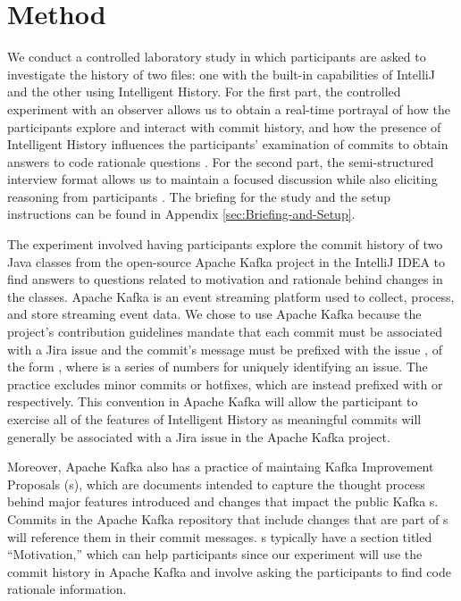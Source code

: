 \section{Method}
\label{sec:Method}

We conduct a controlled laboratory study in which participants are
asked to investigate the history of two files: one with the built-in
capabilities of IntelliJ and the other using Intelligent History.
For the first part, the controlled experiment with an observer allows us to obtain a real-time 
portrayal of how the participants explore and interact with commit history,
and how the presence of Intelligent History influences the participants'
examination of commits to obtain answers to code rationale questions \cite{shull_guide_2007}.
For the second part, the semi-structured interview format allows us to maintain a focused discussion 
while also eliciting reasoning from participants \cite{shull_guide_2007}.
The briefing for the study and the setup instructions can be found in Appendix \ref{sec:Briefing-and-Setup}.

The experiment involved having participants explore the commit history of two Java classes 
from the open-source Apache Kafka project in the IntelliJ IDEA  
to find answers to questions related to motivation and rationale behind changes in the classes.
Apache Kafka is an event streaming platform used to collect, process, and store streaming event data.
We chose to use Apache Kafka because the project's contribution guidelines mandate that
each commit must be associated with a Jira issue and the commit's message 
must be prefixed with the issue , of the form , 
where  is a series of numbers for uniquely identifying an issue.
The practice excludes minor commits or hotfixes, 
which are instead prefixed with  or  respectively.
This convention in Apache Kafka will allow the participant to exercise all of the features of Intelligent History
as meaningful commits will generally be associated with a Jira issue in the Apache Kafka project.

Moreover, Apache Kafka also has a practice of maintaing Kafka Improvement Proposals (s),
which are documents intended to capture the thought process behind major features introduced 
and changes that impact the public Kafka s.
Commits in the Apache Kafka repository that include changes that are part of s will
reference them in their commit messages.
s typically have a section titled ``Motivation,''
which can help participants since our experiment will use the commit history 
in Apache Kafka and involve asking the participants to find code rationale information.

